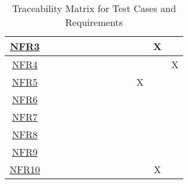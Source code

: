 \documentclass[12pt, titlepage]{article}
\begin{document}
\begin{table}[H]
\begin{tabular}{|c|cccccccccccc|}
\hyperref[NFR3]{NFR3} & \multicolumn{1}{c|}{}  & \multicolumn{1}{c|}{}  & \multicolumn{1}{c|}{}
& \multicolumn{1}{c|}{}  & \multicolumn{1}{c|}{}  & \multicolumn{1}{c|}{}
& \multicolumn{1}{c|}{}  & \multicolumn{1}{c|}{}  & \multicolumn{1}{c|}{}
& \multicolumn{1}{c|}{}   & \multicolumn{1}{c|}{X}   &    \\ \hline

\hyperref[NFR4]{NFR4} & \multicolumn{1}{c|}{}  & \multicolumn{1}{c|}{}  & \multicolumn{1}{c|}{}
& \multicolumn{1}{c|}{}  & \multicolumn{1}{c|}{}  & \multicolumn{1}{c|}{}
& \multicolumn{1}{c|}{}  & \multicolumn{1}{c|}{}  & \multicolumn{1}{c|}{}
& \multicolumn{1}{c|}{}   & \multicolumn{1}{c|}{}   &  X  \\ \hline

\hyperref[NFR5]{NFR5} & \multicolumn{1}{c|}{}  & \multicolumn{1}{c|}{}  & \multicolumn{1}{c|}{}
& \multicolumn{1}{c|}{}  & \multicolumn{1}{c|}{}  & \multicolumn{1}{c|}{}
& \multicolumn{1}{c|}{}  & \multicolumn{1}{c|}{}  & \multicolumn{1}{c|}{}
& \multicolumn{1}{c|}{X}   & \multicolumn{1}{c|}{}   &    \\ \hline

\hyperref[NFR6]{NFR6} & \multicolumn{1}{c|}{}  & \multicolumn{1}{c|}{}  & \multicolumn{1}{c|}{}
& \multicolumn{1}{c|}{}  & \multicolumn{1}{c|}{}  & \multicolumn{1}{c|}{}
& \multicolumn{1}{c|}{}  & \multicolumn{1}{c|}{}  & \multicolumn{1}{c|}{}
& \multicolumn{1}{c|}{}   & \multicolumn{1}{c|}{}   &    \\ \hline

\hyperref[NFR7]{NFR7} & \multicolumn{1}{c|}{}  & \multicolumn{1}{c|}{}  & \multicolumn{1}{c|}{}
& \multicolumn{1}{c|}{}  & \multicolumn{1}{c|}{}  & \multicolumn{1}{c|}{}
& \multicolumn{1}{c|}{}  & \multicolumn{1}{c|}{}  & \multicolumn{1}{c|}{}
& \multicolumn{1}{c|}{}   & \multicolumn{1}{c|}{}   &    \\ \hline

\hyperref[NFR8]{NFR8} & \multicolumn{1}{c|}{}  & \multicolumn{1}{c|}{}  & \multicolumn{1}{c|}{}
& \multicolumn{1}{c|}{}  & \multicolumn{1}{c|}{}  & \multicolumn{1}{c|}{}
& \multicolumn{1}{c|}{}  & \multicolumn{1}{c|}{}  & \multicolumn{1}{c|}{}
& \multicolumn{1}{c|}{}   & \multicolumn{1}{c|}{}   &    \\ \hline

\hyperref[NFR9]{NFR9} & \multicolumn{1}{c|}{}  & \multicolumn{1}{c|}{}  & \multicolumn{1}{c|}{}
& \multicolumn{1}{c|}{}  & \multicolumn{1}{c|}{}  & \multicolumn{1}{c|}{}
& \multicolumn{1}{c|}{}  & \multicolumn{1}{c|}{}  & \multicolumn{1}{c|}{}
& \multicolumn{1}{c|}{}   & \multicolumn{1}{c|}{}   &    \\ \hline

\hyperref[NFR10]{NFR10} & \multicolumn{1}{c|}{}  & \multicolumn{1}{c|}{}  & \multicolumn{1}{c|}{}
& \multicolumn{1}{c|}{}  & \multicolumn{1}{c|}{}  & \multicolumn{1}{c|}{}
& \multicolumn{1}{c|}{}  & \multicolumn{1}{c|}{}  & \multicolumn{1}{c|}{}
& \multicolumn{1}{c|}{}   & \multicolumn{1}{c|}{X}   &    \\ \hline
    \end{tabular}
    \label{tab:traceability}
    \caption{Traceability Matrix for Test Cases and Requirements}
\end{table}
\end{document}
